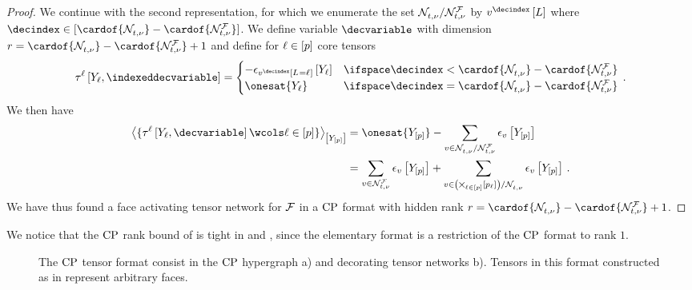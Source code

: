 \begin{proof}
    We continue with the second representation, for which we enumerate the set $\mathcal{N}_{t,\nu}^{}/\mathcal{N}_{t,\nu}^{\mathcal{F}}$ by $\imelementofat{\decindex}{\selvariable}$ where $\decindex\in[\cardof{\genimset}-\cardof{\genfaceimset}]$.
    We define variable $\decvariable$ with dimension $r=\cardof{\genimset}-\cardof{\genfaceimset}+1$ and define for $\ell\in[p]$ core tensors
    \begin{align*}
        \hypercoreofat{\selindex}{\headvariableof{\selindex},\indexeddecvariable}
        =
        \begin{cases}
            -\onehotmapofat{\imelementofat{\decindex}{\indexedselvariable}}{\headvariableof{\selindex}} & \ifspace \decindex < \cardof{\genimset}-\cardof{\genfaceimset} \\
            \onesat{\headvariableof{\selindex}} & \ifspace \decindex = \cardof{\genimset}-\cardof{\genfaceimset}
        \end{cases} \, .
    \end{align*}
    We then have
    \begin{align*}
        \contractionof{\{\hypercoreofat{\selindex}{\headvariableof{\selindex},\decvariable}\wcols\selindexin\}}{\headvariables}
        &=\onesat{\headvariables} - \sum_{\imelement\in\genimset/\genfaceimset} \onehotmapofat{\imelement}{\headvariables} \\
        &= \sum_{\imelement\in\genfaceimset} \onehotmapofat{\imelement}{\headvariables}
        + \sum_{\imelement\in\left(\bigtimes_{\selindexin}[\seldimof{\selindex}]\right)/\genimset} \onehotmapofat{\imelement}{\headvariables} \, .
    \end{align*}
    We have thus found a face activating tensor network for $\mathcal{F}$ in a $\mathrm{CP}$ format with hidden rank $r=\cardof{\genimset}-\cardof{\genfaceimset}+1$.
\end{proof}

We notice that the $\mathrm{CP}$ rank bound of  is tight in  and , since the elementary format is a restriction of the $\mathrm{CP}$ format to rank $1$.

\begin{figure}
    
    \caption{The $\mathrm{CP}$ tensor format consist in the $\mathrm{CP}$ hypergraph a) and decorating tensor networks b).
    Tensors in this format constructed as in  represent arbitrary faces.}
    \label{fig:cpFormat}
\end{figure}

